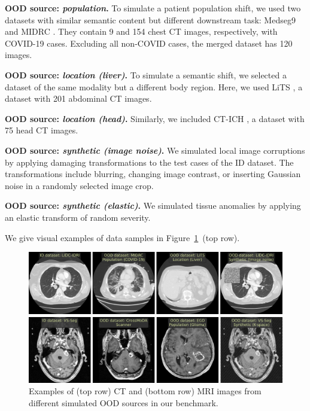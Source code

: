 \textbf{OOD source: \textit{population}.} To simulate a patient population shift, we used two datasets with similar semantic content but different downstream task: Medseg9 and MIDRC \cite{tsai2021rsna}. They contain 9 and 154 chest CT images, respectively, with COVID-19 cases. Excluding all non-COVID cases, the merged dataset has 120 images.

\textbf{OOD source: \textit{location (liver)}.} To simulate a semantic shift, we selected a dataset of the same modality but a different body region. Here, we used LiTS \cite{bilic2023liver}, a dataset with 201 abdominal CT images.

\textbf{OOD source: \textit{location (head)}.} Similarly, we included CT-ICH \cite{hssayeni2020computed}, a dataset with 75 head CT images.

\textbf{OOD source: \textit{synthetic (image noise)}.} We simulated local image corruptions by applying damaging transformations to the test cases of the ID dataset. The transformations include blurring, changing image contrast, or inserting Gaussian noise in a randomly selected image crop.

\textbf{OOD source: \textit{synthetic (elastic)}.} We simulated tissue anomalies by applying an elastic transform of random severity.



We give visual examples of data samples in Figure~\ref{fig:ood_examples}~(top row).%

\begin{landscape}
	\begin{figure}[p]
		\centering
		\begin{minipage}{\linewidth}
			\centering
			\includegraphics[width=\linewidth]{Dissertation/Figures/5_ood_bench/ct_examples_2.pdf}
			
			\vspace{0.5em} %
			
			\includegraphics[width=\linewidth]{Dissertation/Figures/5_ood_bench/mri_examples_2.pdf}
		\end{minipage}
		\caption{Examples of (top row) CT and (bottom row) MRI images from different simulated OOD sources in our benchmark.}%
		\label{fig:ood_examples}
	\end{figure}
\end{landscape}


